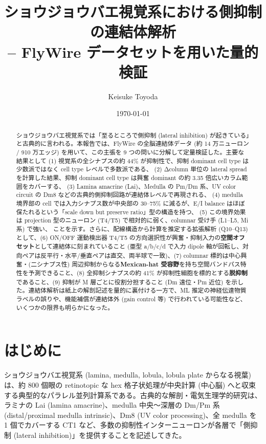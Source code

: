 \documentclass[11pt,a4paper]{ltjsarticle}
\title{ショウジョウバエ視覚系における側抑制の連結体解析\\
\large -- FlyWire データセットを用いた量的検証}
\author{Keisuke Toyoda}
\date{\today}
\begin{document}
\maketitle

\begin{abstract}
ショウジョウバエ視覚系では「至るところで側抑制 (lateral inhibition) が起きている」と古典的に言われる。本報告では、FlyWire の全脳連結体データ (約 14 万ニューロン / 910 万エッジ) を用いて、この主張を 9 つの問いに分解して定量検証した。主要な結果として
(1) 視覚系の全シナプスの約 44\% が抑制性で、抑制 dominant cell type は少数派ではなく cell type レベルで多数派である、
(2) Δcolumn 単位の lateral spread を計算した結果、抑制 dominant cell type は興奮 dominant の約 3.35 倍広いカラム範囲をカバーする、
(3) Lamina amacrine (Lai)、Medulla の Pm/Dm 系、UV color circuit の Dm8 などの古典的側抑制回路が連結体レベルで再現される、
(4) medulla 境界部の cell では入力シナプス数が中央部の 30–75\% に減るが、E/I balance はほぼ保たれるという「scale down but preserve ratio」型の構造を持つ、
(5) この境界効果は projection 型のニューロン (T4/T5) で相対的に弱く、columnar 受け手 (L1--L5, Mi 系) で強い、
ことを示す。さらに、配線構造から計算を推定する拡張解析 (Q10--Q13) として、(6) ON/OFF 運動検出器 T4/T5 の方向選択性が興奮・抑制入力の\textbf{空間オフセット}として連結体に刻まれていること (亜型 a/b/c/d で入力 dipole 軸が回転し、対向ペアは反平行・水平/垂直ペアは直交、両半球で一致)、(7) columnar 標的は中心興奮・(二シナプス性) 周辺抑制からなる\textbf{Mexican-hat 受容野}を持ち空間バンドパス特性を予測できること、(8) 全抑制シナプスの約 41\% が抑制性細胞を標的とする\textbf{脱抑制}であること、(9) 抑制が M 層ごとに役割分担すること (Dm 遠位・Pm 近位) を示した。連結体解析は紙上の解剖記述を量的に裏付ける一方で、ML 推定の神経伝達物質ラベルの誤りや、機能補償が連結体外 (gain control 等) で行われている可能性など、いくつかの限界も明らかになった。
\end{abstract}

\section{はじめに}\label{sec:intro}

ショウジョウバエ視覚系 (lamina, medulla, lobula, lobula plate からなる視葉) は、約 800 個眼の retinotopic な hex 格子状処理が中央計算 (中心脳) へと収束する典型的なパラレル並列計算系である。古典的な解剖・電気生理学的研究は、ラミナの Lai (lamina amacrine)、medulla 中央〜深層の Dm/Pm 系 (distal/proximal medulla intrinsic)、Dm8 (UV color processing)、全 medulla を 1 個でカバーする CT1 など、多数の抑制性インターニューロンが各層で「側抑制 (lateral inhibition)」を提供することを記述してきた。
\end{document}
